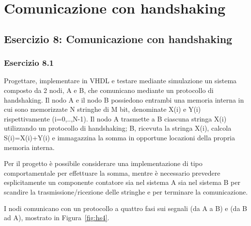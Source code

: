 \chapter{Comunicazione con handshaking}

\section{Esercizio 8: Comunicazione con handshaking}

\subsection{Esercizio 8.1}

\begin{traccia}
	Progettare, implementare in VHDL e testare mediante simulazione un sistema composto da 2
	nodi, A e B, che comunicano mediante un protocollo di handshaking. Il nodo A e il nodo B
	possiedono entrambi una memoria interna in cui sono memorizzate N stringhe di M bit,
	denominate X(i) e Y(i) rispettivamente (i=0,..,N-1). Il nodo A trasmette a B ciascuna
	stringa X(i) utilizzando un protocollo di handshaking; B, ricevuta la stringa X(i), calcola
	S(i)=X(i)+Y(i) e immagazzina la somma in opportune locazioni della propria memoria interna.

	Per il progetto è possibile considerare una implementazione di tipo comportamentale per
	effettuare la somma, mentre è necessario prevedere esplicitamente un componente contatore
	sia nel sistema A sia nel sistema B per scandire la trasmissione/ricezione delle stringhe e
	per terminare la comunicazione.
\end{traccia}

\progetto

\begin{scelta}
	I nodi comunicano con un protocollo a quattro fasi sui segnali  (da A a B) e
	 (da B ad A), mostrato in Figura~\ref{fig:hs4}.
\end{scelta}

